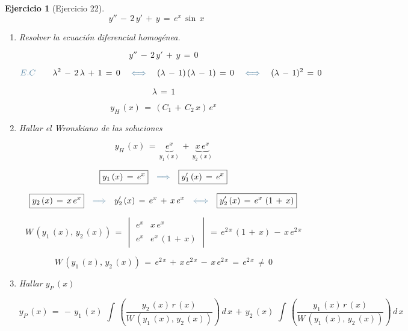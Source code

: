 \documentclass[a4paper,11pt, openany]{book}
\newtheorem{ejer}{Ejercicio}[section]
\newcommand*{\itembolasazules}[1]{%
\footnotesize\protect\tikz[baseline=-3pt]%
\protect\node[scale=.7, circle, shade, ball
color=green]{\color{white}\Large\bf#1};}
\begin{document}
\begin{ejer}[Ejercicio 22]
 
$$y''\,-\,2\,y'\,+\,y\,=\,e^{x}\,\sin\,x$$
 
\begin{enumerate}[label=\itembolasazules{\arabic*}]
 
 
\item  Resolver la ecuación diferencial homogénea.
 
$$y''\,-\,2\,y'\,+\,y\,=\,0$$
 
$$\textcolor{airforceblue}{E.C} \qquad \lambda^{2}\,-\,2\,\lambda\,+\,1\,=\,0 \quad \textcolor{airforceblue}{\iff} \quad (\lambda\,-\,1)\,(\lambda\,-\,1)\,=\,0 \quad \textcolor{airforceblue}{\iff} \quad (\lambda\,-\,1)^{2}\,=\,0$$
 
$$\boxed{\lambda\,=\,1}$$
 
$$\boxed{y_{H}\,(x)\,=\,(C_{1}\,+\,C_{2}\,x)\,e^{x}}$$
 
\item Hallar el Wronskiano de las soluciones 
 
$$y_{H}\,(x)\,=\,\underbrace{e^{x}}_{y_{1}\,(x)}\,+\,\underbrace{x\,e^{x}}_{y_{2}\,(x)}$$
 
$$\boxed{y_{1}\,(x)\,=\,e^{x}} \quad \textcolor{airforceblue}{\Longrightarrow} \quad \boxed{y_{1}'\,(x)\,=\,e^{x}}$$
 
$$\boxed{y_{2}\,(x)\,=\,x\,e^{x}} \quad \textcolor{airforceblue}{\Longrightarrow} \quad y_{2}'\,(x)\,=\,e^{x}\,+\,x\,e^{x} \quad \textcolor{airforceblue}{\Longleftrightarrow} \quad \boxed{y_{2}'\,(x)\,=\,e^{x}\,\left(1\,+\,x \right)}$$
 
$$W\,\left(y_{1}\,(x),\,y_{2}\,(x) \right)\,=\,\begin{vmatrix}
e^{x} & x\,e^{x} \\
\\
e^{x} & e^{x}\,(1\,+\,x)
\end{vmatrix}\,=\,e^{2\,x}\,\left(1\,+\,x \right)\,-\,x\,e^{2\,x}$$
 
$$W\,\left(y_{1}\,(x),\,y_{2}\,(x) \right)\,=\,e^{2\,x}\,+\,x\,e^{2\,x}\,-\,x\,e^{2\,x}\,=\,\boxed{e^{2\,x}\,\neq\,0} $$
 
\item Hallar $y_{P}\,(x)$
 
$$y_{P}\,(x)\,=\,-\,y_{1}\,(x)\,\displaystyle\,\int\,\left(\dfrac{y_{2}\,(x)\,r\,(x) }{W\,\left(y_{1}\,(x),\,y_{2}\,(x) \right) }  \right)\,d\,x\,+\,y_{2}\,(x)\,\displaystyle\,\int\,\left(\dfrac{y_{1}\,(x)\,r\,(x) }{W\,\left(y_{1}\,(x),\,y_{2}\,(x) \right) }  \right)\,d\,x$$
 

\end{enumerate}
\end{ejer}
\end{document}
